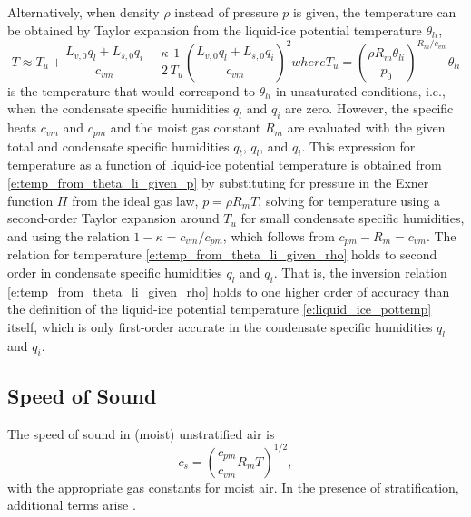 \documentclass{report}
\begin{document}
Alternatively, when density $\rho$ instead of pressure $p$ is given, the temperature can be obtained by Taylor expansion from the liquid-ice potential temperature $\theta_{li}$,
\begin{subequations}\label{e:temp_from_theta_li_given_rho}
\begin{equation}
T \approx T_u + \frac{L_{v,0} q_l + L_{s,0}q_i}{c_{vm}} - \frac{\kappa}{2} \frac{1}{T_u}\left(\frac{L_{v,0} q_l + L_{s,0} q_i}{c_{vm}}\right)^2
\end{equation}
where 
\begin{equation}
   T_u =  \left( \frac{\rho R_m \theta_{li}}{p_0} \right)^{R_m/c_{vm}} \theta_{li}
\end{equation}
\end{subequations}
is the temperature that would correspond to $\theta_{li}$ in unsaturated conditions, i.e., when the condensate specific humidities $q_l$ and $q_i$ are zero. However, the specific heats $c_{vm}$ and $c_{pm}$ and the moist gas constant $R_m$ are evaluated with the given total and condensate specific humidities $q_t$, $q_l$, and $q_i$.
This expression for temperature as a function of liquid-ice potential temperature is obtained from \eqref{e:temp_from_theta_li_given_p} by substituting for pressure in the Exner function $\Pi$ from the ideal gas law, $p=\rho R_m T$, solving for temperature using a second-order Taylor expansion around $T_u$ for small condensate specific humidities, and using the relation $1-\kappa = c_{vm}/c_{pm}$, which follows from $c_{pm} - R_m = c_{vm}$. The relation for temperature \eqref{e:temp_from_theta_li_given_rho} holds to second order in condensate specific humidities $q_l$ and $q_i$. That is, the inversion relation \eqref{e:temp_from_theta_li_given_rho} holds to one higher order of accuracy than the definition of the liquid-ice potential temperature \eqref{e:liquid_ice_pottemp} itself, which is only first-order accurate in the condensate specific humidities $q_l$ and $q_i$.

\subsection{Speed of Sound} The speed of sound in (moist) unstratified air is 
\begin{equation}\label{e:soundspeed}
 c_s = \left(\frac{c_{pm}}{c_{vm}} R_m T \right)^{1/2}, 
\end{equation}
with the appropriate gas constants for moist air. In the presence of stratification, additional terms arise \citep{Durran99}.
\end{document}
